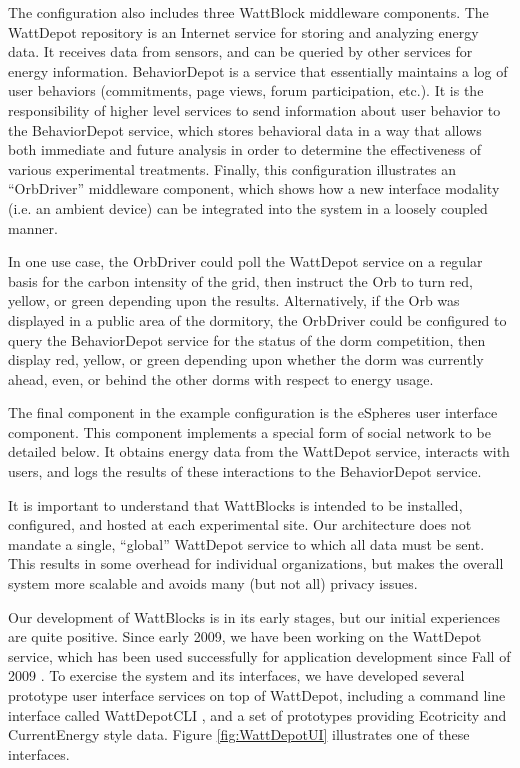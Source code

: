 The configuration also includes three WattBlock middleware components.  The
WattDepot repository is an Internet service for storing and analyzing
energy data.  It receives data from sensors, and can be queried by other
services for energy information.  BehaviorDepot is a service that
essentially maintains a log of user behaviors (commitments, page views,
forum participation, etc.).  It is the responsibility of higher level
services to send information about user behavior to the BehaviorDepot
service, which stores behavioral data in a way that allows both immediate
and future analysis in order to determine the effectiveness of various
experimental treatments.  Finally, this configuration illustrates an
``OrbDriver'' middleware component, which shows how a new interface
modality (i.e. an ambient device) can be integrated into the system in a
loosely coupled manner.

In one use case,  the OrbDriver could poll the WattDepot service on a regular
basis for the carbon intensity of the grid, then instruct the Orb to turn
red, yellow, or green depending upon the results. Alternatively, if the Orb
was displayed in a public area of the dormitory, the OrbDriver could be
configured to query the BehaviorDepot service for the status of the dorm
competition, then display red, yellow, or green depending upon whether the
dorm was currently ahead, even, or behind the other dorms with respect to
energy usage.

The final component in the example configuration is the eSpheres user
interface component.  This component implements a special form of social
network to be detailed below. It obtains energy data from the WattDepot service,
interacts with users, and logs the results of these interactions to the
BehaviorDepot service.

It is important to understand that WattBlocks is intended to be installed,
configured, and hosted at each experimental site.  Our architecture does
not mandate a single, ``global'' WattDepot service to which all data
must be sent.  This results in some overhead for
individual organizations, but makes the overall system more scalable and
avoids many (but not all) privacy issues.

Our development of WattBlocks is in its early stages, but our initial
experiences are quite positive.  Since early 2009, we have been working on
the WattDepot service, which has been used successfully for application
development since Fall of 2009 \cite{WattDepot}.  To exercise the system
and its interfaces, we have developed several prototype user interface
services on top of WattDepot, including a command line interface called
WattDepotCLI \cite{WattDepotCLI}, and a set of prototypes providing Ecotricity and
CurrentEnergy style data.  Figure \ref{fig:WattDepotUI} illustrates one of
these interfaces.

